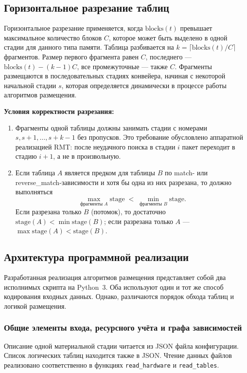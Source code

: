 \subsection{Горизонтальное разрезание таблиц}

Горизонтальное разрезание применяется, когда $\text{blocks}(t)$ превышает максимальное количество блоков $C$, которое может быть выделено в одной стадии для данного типа памяти. Таблица разбивается на $k = \lceil \text{blocks}(t) / C \rceil$ фрагментов. Размер первого фрагмента равен $C$, последнего — $\text{blocks}(t) - (k-1)C$, все промежуточные — также $C$. Фрагменты размещаются в последовательных стадиях конвейера, начиная с некоторой начальной стадии $s$, которая определяется динамически в процессе работы алгоритмов размещения.

\noindent\textbf{Условия корректности разрезания:}
\begin{enumerate}
	\item Фрагменты одной таблицы должны занимать стадии с номерами $s, s+1, \dots, s+k-1$ без пропусков.  
	Это требование обусловлено аппаратной реализацией RMT: после неудачного поиска в стадии $i$ пакет переходит в стадию $i+1$, а не в произвольную.
	\item Если таблица $A$ является предком для таблицы $B$ по match- или reverse\_match-зависимости и хотя бы одна из них разрезана, то должно выполняться  
	\[
	\max_{\text{фрагменты } A} \text{stage} \;<\; \min_{\text{фрагменты } B} \text{stage}.
	\]  
	Если разрезана только $B$ (потомок), то достаточно $\text{stage}(A) < \min \text{stage}(B)$; если разрезана только $A$ — $\max \text{stage}(A) < \text{stage}(B)$.
\end{enumerate}

\subsection{Архитектура программной реализации}
\label{sec:arch-software}

Разработанная реализация алгоритмов размещения представляет собой два исполнимых скрипта на Python~3. Оба используют один и тот же способ кодирования входных данных. Однако, различаются порядок обхода таблиц и логикой размещения.

\subsubsection{Общие элементы входа, ресурсного учёта и графа зависимостей}
Описание одной материальной стадии читается из JSON файла конфигурации. Список логических таблиц находится также в JSON. Чтение данных файлов реализовано соответственно в функциях \texttt{read\_hardware} и \texttt{read\_tables}.

